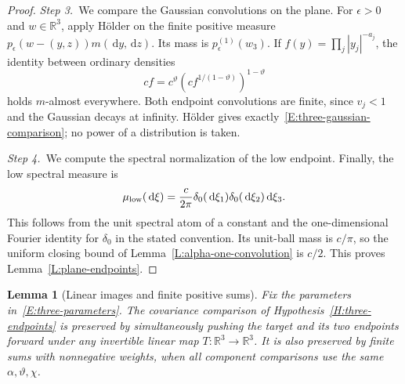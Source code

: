 \documentclass[12pt,oneside,openany]{book}
\makeatletter
\let\lean@pending\@empty
\newcommand{\LeanMarker}[1]{\gdef\lean@pending{#1}}
\numberwithin{equation}{section}
\newtheorem{lemma}[theorem]{Lemma}
\theoremstyle{nogostyle}
\theoremstyle{definition}
\newcommand{\R}{\mathbb{R}}
\newcommand{\ud}{\,\mathrm{d}}
\makeatother
\begin{document}
\begin{proof}
  \medskip
  \noindent\textit{Step 3.~}We compare the Gaussian convolutions on the plane.
  For $\epsilon > 0$ and $w \in \R^3$, apply H\"older on the finite positive
  measure $p_\epsilon(w-(y,z))m(\ud y,\ud z)$. Its mass is
  $p_\epsilon^{(1)}(w_3)$. If $f(y) = \prod_j|y_j|^{-a_j}$, the identity between
  ordinary densities
  \[
    cf=c^\vartheta
    \left(cf^{1/(1-\vartheta)}\right)^{1-\vartheta}
  \]
  holds $m$-almost everywhere. Both endpoint convolutions are finite, since $v_j
  < 1$ and the Gaussian decays at infinity. H\"older gives
  exactly~\eqref{E:three-gaussian-comparison}; no power of a distribution is
  taken.


  \medskip
  \noindent\textit{Step 4.~}We compute the spectral normalization of the low
  endpoint.
  Finally, the low spectral measure is
  \[
    \mu_{\rm low}(\ud\xi)
    =\frac{c}{2\pi}\delta_0(\ud\xi_1)\delta_0(\ud\xi_2)\ud\xi_3.
  \]
  This follows from the unit spectral atom of a constant and the one-dimensional
  Fourier identity for $\delta_0$ in the stated convention. Its unit-ball mass
  is $c/\pi$, so the uniform closing bound of
  Lemma~\ref{L:alpha-one-convolution} is $c/2$. This proves
  Lemma~\ref{L:plane-endpoints}.
\end{proof}

\LeanMarker{L:endpoint-closure}
\begin{lemma}[Linear images and finite positive sums]\label{L:endpoint-closure}
  Fix the parameters in~\eqref{E:three-parameters}. The covariance comparison of
  Hypothesis~\ref{H:three-endpoints} is preserved by simultaneously pushing the
  target and its two endpoints forward under any invertible linear map $T:\R^3
  \to \R^3$. It is also preserved by finite sums with nonnegative weights, when
  all component comparisons use the same $\alpha,\vartheta,\chi$.
\end{lemma}
\end{document}
